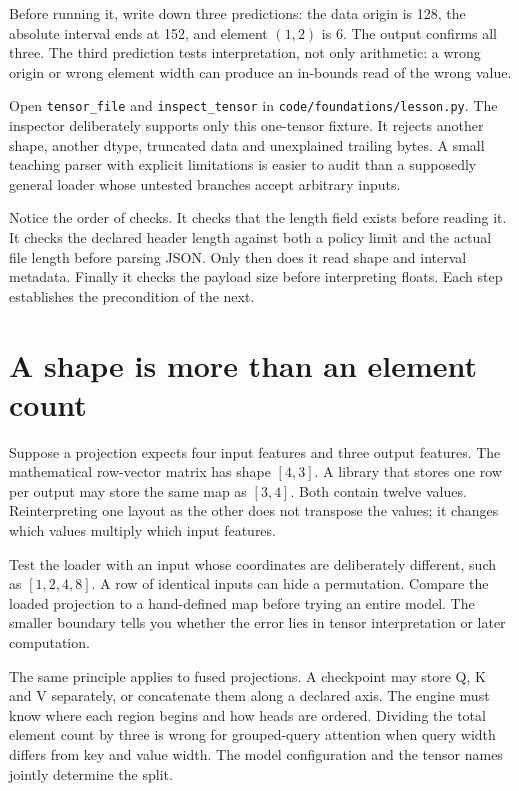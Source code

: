 Before running it, write down three predictions: the data origin is 128,
the absolute interval ends at 152, and element $(1,2)$ is 6. The output
confirms all three. The third prediction tests interpretation, not only
arithmetic: a wrong origin or wrong element width can produce an in-bounds
read of the wrong value.

Open \texttt{tensor\_file} and \texttt{inspect\_tensor} in
\texttt{code/foundations/lesson.py}. The inspector deliberately supports
only this one-tensor fixture. It rejects another shape, another dtype,
truncated data and unexplained trailing bytes. A small teaching parser
with explicit limitations is easier to audit than a supposedly general
loader whose untested branches accept arbitrary inputs.

Notice the order of checks. It checks that the length field exists before
reading it. It checks the declared header length against both a policy
limit and the actual file length before parsing JSON. Only then does it
read shape and interval metadata. Finally it checks the payload size before
interpreting floats. Each step establishes the precondition of the next.

\section{A shape is more than an element count}
Suppose a projection expects four input features and three output
features. The mathematical row-vector matrix has shape $[4,3]$.
A library that stores one row per output may store the same map as
$[3,4]$. Both contain twelve values. Reinterpreting one layout as the
other does not transpose the values; it changes which values multiply
which input features.

Test the loader with an input whose coordinates are deliberately
different, such as $[1,2,4,8]$. A row of identical inputs can hide a
permutation. Compare the loaded projection to a hand-defined map before
trying an entire model. The smaller boundary tells you whether the
error lies in tensor interpretation or later computation.

The same principle applies to fused projections. A checkpoint may store
Q, K and V separately, or concatenate them along a declared axis.
The engine must know where each region begins and how heads are ordered.
Dividing the total element count by three is wrong for grouped-query
attention when query width differs from key and value width.
The model configuration and the tensor names jointly determine the split.

